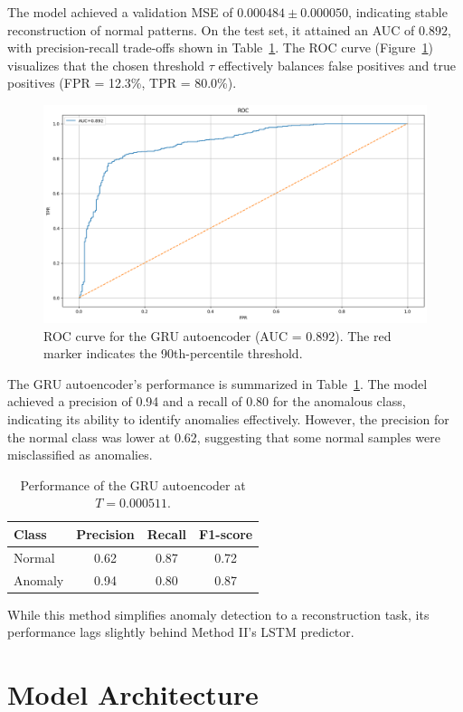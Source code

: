 \documentclass[ngerman]{scrartcl}
\begin{document}
\noindent The model achieved a validation MSE of \(0.000484 \pm 0.000050\), indicating stable reconstruction of normal patterns. On the test set, it attained an AUC of \(0.892\), with precision-recall trade-offs shown in Table~\ref{tab:gru_results}. The ROC curve (Figure~\ref{fig:rocGRU}) visualizes that the chosen threshold \(\tau\) effectively balances false positives and true positives (FPR = 12.3\%, TPR = 80.0\%).
\begin{figure}[h]
    \centering
    \includegraphics[width=\textwidth]{./Figures/ROC_Autoenc.png}
    \caption{ROC curve for the GRU autoencoder (AUC = 0.892). The red marker indicates the 90th-percentile threshold.}
    \label{fig:rocGRU}
\end{figure}
\noindent The GRU autoencoder's performance is summarized in Table~\ref{tab:gru_results}. The model achieved a precision of 0.94 and a recall of 0.80 for the anomalous class, indicating its ability to identify anomalies effectively. However, the precision for the normal class was lower at 0.62, suggesting that some normal samples were misclassified as anomalies.
\begin{table}[h]
    \centering
    \begin{tabular}{lccc}
        \toprule
        Class & Precision & Recall & F1-score \\
        \midrule
        Normal & 0.62 & 0.87 & 0.72 \\
        Anomaly & 0.94 & 0.80 & 0.87 \\
        \bottomrule
    \end{tabular}
    \caption{Performance of the GRU autoencoder at \(T = 0.000511\).}
    \label{tab:gru_results}
\end{table}
\noindent While this method simplifies anomaly detection to a reconstruction task, its performance lags slightly behind Method II's LSTM predictor.%



\section{Model Architecture}
\end{document}
